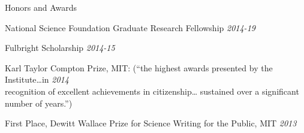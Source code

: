 \documentclass{resume} %
\begin{document}
\begin{rSection}{Honors and Awards}
  \vspace{-10pt}
  \begin{rSubsection}{}{}{}{}
\item
National Science Foundation Graduate Research Fellowship \hfill {\em 2014-19}
\item
Fulbright Scholarship \hfill {\em 2014-15}
\item
  Karl Taylor Compton Prize, MIT: 
  (``the highest awards presented by the Institute\ldots in \hfill {\em 2014} \\
recognition of excellent achievements in citizenship\ldots
sustained over a significant number of years.'')
\item
First Place, Dewitt Wallace Prize for Science Writing for the Public, 
MIT \hfill {\em 2013} 
\end{rSubsection}

\end{rSection}

\end{document}
